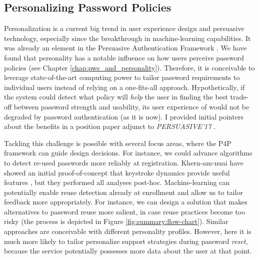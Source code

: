 \subsection{Personalizing Password Policies}\label{sec:pst:personalizing-policies}
Personalization is a current big trend in user experience design and persuasive technology, especially since the breakthrough in machine-learning capabilities. It was already an element in the Persuasive Authentication Framework \cite{Forget2007PersuasionEducationSecurity}. We have found that personality has a notable influence on how users perceive password policies (see Chapter \ref{chap:pws_and_personality}). Therefore, it is conceivable to leverage state-of-the-art computing power to tailor password requirements to individual users instead of relying on a one-fits-all approach. Hypothetically, if the system could detect what policy will \textit{help} the user in finding the best trade-off between password strength and usability, its user experience of would not be degraded by password authentication (as it is now). I provided initial pointers about the benefits in a position paper adjunct to \textit{PERSUASIVE'17} \cite{Seitz2017PersonalizingPasswordPolicies}. 

Tackling this challenge is possible with several focus areas, where the P4P framework can guide design decisions. For instance, we could advance algorithms to detect re-used passwords more reliably at registration. Khern-am-nuai \etal have showed an initial proof-of-concept that keystroke dynamics provide useful features \cite{Khern-am-nuai2017Journal}, but they performed all analyses post-hoc. Machine-learning can potentially enable reuse detection already at enrollment and allow us to tailor feedback more appropriately. For instance, we can design a solution that makes alternatives to password reuse more salient, in case reuse practices become too risky (the process is depicted in Figure \ref{fig:summary:flow-chart}). Similar approaches are conceivable with different personality profiles. However, here it is much more likely to tailor personalize support strategies during password \textit{reset}, because the service potentially possesses more data about the user at that point. 

